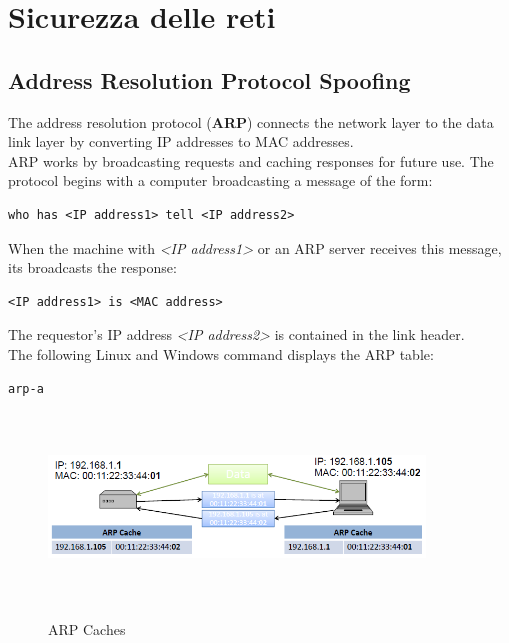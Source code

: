 \chapter{Sicurezza delle reti}
\section{Address Resolution Protocol Spoofing}
The address resolution protocol (\textbf{ARP}) connects the network layer to the data link layer by converting IP addresses to MAC addresses. \\
ARP works by broadcasting requests and caching responses for future use. The protocol begins with a computer broadcasting a message of the form: 
\begin{lstlisting}
who has <IP address1> tell <IP address2>
\end{lstlisting}
When the machine with \textit{<IP address1>} or an ARP server receives this message, its broadcasts the response:
\begin{lstlisting}
<IP address1> is <MAC address>
\end{lstlisting}
The requestor's IP address \textit{<IP address2>} is contained in the link header.\\
The following Linux and Windows command displays the ARP table:
\begin{lstlisting}
arp-a
\end{lstlisting}
\begin{figure}[htbp]
	\centering%
	\subfigure%
	{\includegraphics[height=5cm, width=10cm, keepaspectratio]{Immagini/reti/ARP_Caches.png}}
	\caption{ARP Caches\label{fig:ARP_Caches}} 	
\end{figure}
